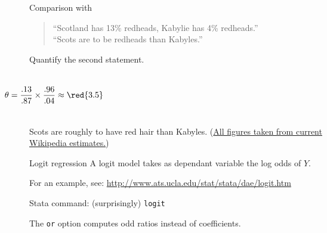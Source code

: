 \documentclass[t]{beamer}
\begin{document}
	\begin{frame}[t]{Comparison with }
					
		\begin{quote}
		``Scotland has 13\% redheads, Kabylie has 4\% redheads.''\\
		``Scots are  to be redheads than Kabyles.''
		\end{quote}
		
		Quantify the second statement.
		
		\begin{columns}[t]
		\vspace{-.5em}
		
		\vspace{3.275em}	
		$$\hspace{-3em}\theta = \frac{.13}{.87}\times\frac{.96}{.04}\approx\red{3.5}$$
		\end{columns}
	
	\vspace{1.5em}
	Scots are roughly  to have red hair than Kabyles. (\href{http://en.wikipedia.org/wiki/Red_hair}{All figures taken from current Wikipedia estimates.})
		
	\end{frame}	

\begin{frame}[t]{Logit regression}
    A logit model takes as dependant variable the log odds of $Y$.   
\vspace{3.275em}

For an example, see: \url{http://www.ats.ucla.edu/stat/stata/dae/logit.htm}
\vspace{3.275em}

Stata command: (surprisingly) \texttt{logit}
\vspace{3.275em}

The \texttt{or} option computes odd ratios instead of coefficients. 

\end{frame}
\end{document}
